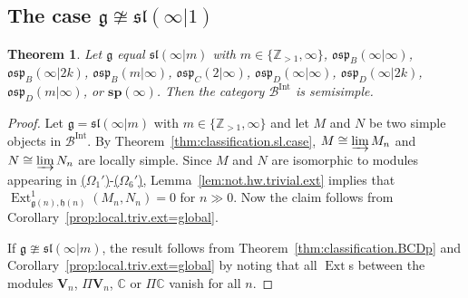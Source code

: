 \documentclass[12pt]{amsart}
\newcommand\C{\mathbb{C}}
\newcommand\Z{\mathbb{Z}}
\newcommand\g{\mathfrak{g}}
\newcommand\fh{\mathfrak{h}}
\newcommand\fsl{\mathfrak{sl}}
\newcommand\fosp{\mathfrak{osp}}
\newcommand\cB{\mathcal{B}}
\newcommand\bV{\mathbf{V}}
\newcommand\bsp{\mathbf{sp}}
\DeclareMathOperator{\Hom}{Hom}
\DeclareMathOperator{\Ext}{Ext}
\DeclareMathOperator{\Int}{Int}
\theoremstyle{plain}
\newtheorem{theo}{Theorem}[section]
\theoremstyle{definition}
\numberwithin{equation}{section}
\begin{document}
\subsection{The case $\g\ncong \fsl(\infty|1)$}
\begin{theo}\label{thm:B.C.D.sp.q-ss}
Let $\g$ equal $\fsl(\infty | m)$ with $m\in \{\Z_{>1}, \infty\}$, $\fosp_B(\infty|\infty)$, $\fosp_B(\infty|2k)$, $\fosp_B(m|\infty)$, $\fosp_C(2|\infty)$, $\fosp_D(\infty|\infty)$, $\fosp_D(\infty|2k)$, $\fosp_D(m|\infty)$, or $\bsp(\infty)$. Then the category $\cB^{\Int}$ is semisimple.
\end{theo}
\begin{proof}
Let $\g = \fsl(\infty | m)$ with $m\in \{\Z_{>1}, \infty\}$ and let $M$ and $N$ be two simple objects in $\cB^{\Int}$. By Theorem~\ref{thm:classification.sl.case}, $M \cong \varinjlim M_n$ and $N \cong \varinjlim N_n$ are locally simple. Since $M$ and $N$ are isomorphic to modules appearing in {\rm \hyperref[sym.type.mod]{($\Omega_1'$)}-\hyperref[partition.type.mod.dual]{($\Omega_6'$)}}, Lemma~\ref{lem:not.hw.trivial.ext} implies that $\Ext_{\g(n), \fh(n)}^1(M_n,N_n)=0$ for $n\gg 0$. Now the claim follows from Corollary~\ref{prop:local.triv.ext=global}.

If $\g\ncong \fsl(\infty|m)$, the result follows from Theorem~\ref{thm:classification.BCDp} and Corollary~\ref{prop:local.triv.ext=global} by noting that all $\Ext$s between the modules $\bV_n$, $\Pi \bV_n$, $\C$ or $\Pi\C$ vanish for all $n$.

\end{proof}
\end{document}
